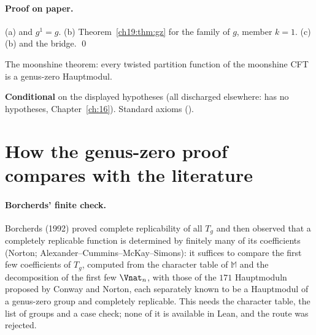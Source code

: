 \paragraph{Proof on paper.}  (a)  and $g^1=g$.  (b) Theorem~\ref{ch19:thm:gz} for the family of $g$, member
$k=1$.  (c) (b) and the bridge. \qed
\begin{physics}The moonshine theorem: every twisted partition function of the moonshine CFT is a genus-zero Hauptmodul.\end{physics}
\begin{status}\textbf{Conditional} on the displayed hypotheses (all discharged elsewhere:  has no hypotheses,
Chapter~\ref{ch:16}).  Standard axioms ().\end{status}

\section{How the genus-zero proof compares with the literature}\label{ch19:sec:compare}

\paragraph{Borcherds' finite check.}  Borcherds (1992) proved complete replicability of all $T_g$ and then observed that a completely
replicable function is determined by finitely many of its coefficients (Norton; Alexander--Cummins--McKay--Simons): it suffices to compare the
first few coefficients of $T_g$, computed from the character table of $\mathbb M$ and the decomposition of the first few $\Vnat_n$, with
those of the $171$ Hauptmoduln proposed by Conway and Norton, each separately known to be a Hauptmodul of a genus-zero group and
completely replicable.  This needs the character table, the list of groups and a case check; none of it is available in Lean, and the
route was rejected.

